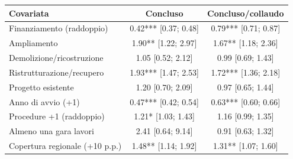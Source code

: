 \begin{tabular}{lcc}
\toprule
Covariata & Concluso & Concluso/collaudo \\
\midrule
Finanziamento (raddoppio) & 0.42*** [0.37; 0.48] & 0.79*** [0.71; 0.87] \\
Ampliamento & 1.90** [1.22; 2.97] & 1.67** [1.18; 2.36] \\
Demolizione/ricostruzione & 1.05 [0.52; 2.12] & 0.99 [0.69; 1.43] \\
Ristrutturazione/recupero & 1.93*** [1.47; 2.53] & 1.72*** [1.36; 2.18] \\
Progetto esistente & 1.20 [0.70; 2.09] & 0.97 [0.65; 1.44] \\
Anno di avvio (+1) & 0.47*** [0.42; 0.54] & 0.63*** [0.60; 0.66] \\
Procedure +1 (raddoppio) & 1.21* [1.03; 1.43] & 1.16 [0.99; 1.35] \\
Almeno una gara lavori & 2.41 [0.64; 9.14] & 0.91 [0.63; 1.32] \\
Copertura regionale (+10 p.p.) & 1.48** [1.14; 1.92] & 1.31** [1.07; 1.60] \\
\bottomrule
\end{tabular}
